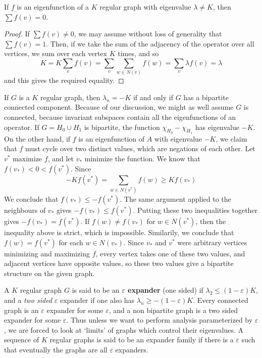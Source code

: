 \begin{lemma}
    If $f$ is an eigenfunction of a $K$ regular graph with eigenvalue $\lambda \neq K$, then $\sum f(v) = 0$.
\end{lemma}
\begin{proof}
    If $\sum f(v) \neq 0$, we may assume without loss of generality that $\sum f(v) = 1$. Then, if we take the sum of the adjacency of the operator over all vertices, we sum over each vertex $K$ times, and so
    \[ K = K \sum_v f(v) = \sum_v \sum_{w \in N(v)} f(w) = \sum_v \lambda f(v) = \lambda \]
    and this gives the required equality.
\end{proof}

\begin{example}
    If $G$ is a $K$ regular graph, then $\lambda_n = -K$ if and only if $G$ has a bipartite connected component. Because of our discussion, we might as well assume $G$ is connected, because invariant subspaces contain all the eigenfunctions of an operator. If $G = H_0 \cup H_1$ is bipartite, the function $\chi_{H_0} - \chi_{H_1}$ has eigenvalue $-K$. On the other hand, if $f$ is an eigenfunction of $A$ with eigenvalue $-K$, we claim that $f$ must cycle over two distinct values, which are negations of each other. Let $v^*$ maximize $f$, and let $v_*$ minimize the function. We know that $f(v_*) < 0 < f(v^*)$. Since
    \[ -Kf(v^*) = \sum_{w \in N(v^*)} f(w) \geq Kf(v_*) \]
    We conclude that $f(v_*) \leq -f(v^*)$. The same argument applied to the neighbours of $v_*$ gives $-f(v_*) \leq f(v^*)$. Putting these two inequalities together gives $-f(v_*) = f(v^*)$. If $f(w) \neq f(v_*)$ for $w \in N(v^*)$, then the inequality above is strict, which is impossible. Similarily, we conclude that $f(w) = f(v^*)$ for each $w \in N(v_*)$. Since $v_*$ and $v^*$ were arbitrary vertices minimizing and maximizing $f$, every vertex takes one of these two values, and adjacent vertices have opposite values, so these two values give a bipartite structure on the given graph.
\end{example}

A $K$ regular graph $G$ is said to be an {\bf $\varepsilon$ expander} (one sided) if $\lambda_2 \leq (1 - \varepsilon)K$, and a {\it two sided} $\varepsilon$ expander if one also has $\lambda_n \geq -(1 - \varepsilon)K$. Every connected graph is an $\varepsilon$ expander for some $\varepsilon$, and a non bipartite graph is a two sided expander for some $\varepsilon$. Thus unless we want to perform analysis parameterized by $\varepsilon$, we are forced to look at `limits' of graphs which control their eigenvalues. A sequence of $K$ regular graphs is said to be an expander family if there is a $\varepsilon$ such that eventually the graphs are all $\varepsilon$ expanders.

